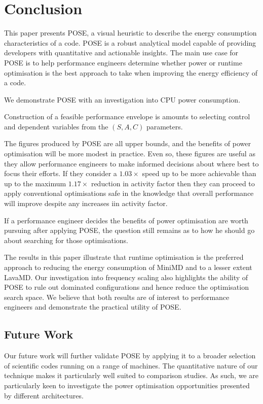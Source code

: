 \section{Conclusion}
\label{sec:conclusion}
This paper presents POSE, a visual heuristic to describe the energy consumption characteristics of a code.
POSE is a robust analytical model capable of providing developers with quantitative and actionable insights.
The main use case for POSE is to help performance engineers determine whether power or runtime optimisation is the best approach to take when improving the energy efficiency of a code.

We demonstrate POSE with an investigation into CPU power consumption.

Construction of a feasible performance envelope is amounts to selecting control and dependent variables from the $(S, A, C)$ parameters.

The figures produced by POSE are all upper bounds, and the benefits of power optimisation will be more modest in practice. Even so, these figures are useful as they allow performance engineers to make informed decisions about where best to focus their efforts. If they consider a $1.03 \times$ speed up to be more achievable than up to the maximum $1.17\times$ reduction in activity factor then they can proceed to apply conventional optimisations safe in the knowledge that overall performance will improve despite any increases iin activity factor.

If a performance engineer decides the benefits of power optimisation are worth pursuing after applying POSE, the question still remains as to how he should go about searching for those optimisations.

The results in this paper illustrate that runtime optimisation is the preferred approach to reducing the energy consumption of MiniMD and to a lesser extent LavaMD.
Our investigation into frequency scaling also highlights the ability of POSE to rule out dominated configurations and hence reduce the optimisation search space.
We believe that both results are of interest to performance engineers and demonstrate the practical utility of POSE.

\subsection{Future Work}
Our future work will further validate POSE by applying it to a broader selection of scientific codes running on a range of machines.
The quantitative nature of our technique makes it particularly well suited to comparison studies.
As such, we are particularly keen to investigate the power optimisation opportunities presented by different architectures.

